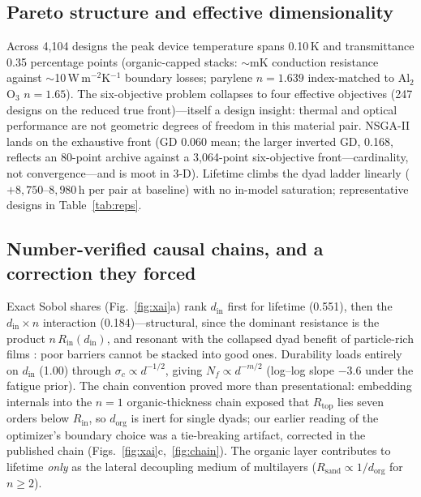 \documentclass[11pt]{article}
\newcommand{\dorg}{d_{\mathrm{org}}}
\newcommand{\din}{d_{\mathrm{in}}}
\begin{document}
\subsection{Pareto structure and effective dimensionality}
Across 4{,}104 designs the peak device temperature spans 0.10\,K and transmittance 0.35 percentage points (organic-capped stacks: $\sim$mK conduction resistance against $\sim$10\,W\,m$^{-2}$K$^{-1}$ boundary losses; parylene $n{=}1.639$ index-matched to Al$_2$O$_3$ $n{=}1.65$). The six-objective problem collapses to four effective objectives (247 designs on the reduced true front)---itself a design insight: thermal and optical performance are not geometric degrees of freedom in this material pair. NSGA-II lands on the exhaustive front (GD 0.060 mean; the larger inverted GD, 0.168, reflects an 80-point archive against a 3{,}064-point six-objective front---cardinality, not convergence---and is moot in 3-D). Lifetime climbs the dyad ladder linearly ($+8{,}750$--$8{,}980$\,h per pair at baseline) with no in-model saturation; representative designs in Table~\ref{tab:reps}.

\subsection{Number-verified causal chains, and a correction they forced}
Exact Sobol shares (Fig.~\ref{fig:xai}a) rank $\din$ first for lifetime (0.551), then the $\din\times n$ interaction (0.184)---structural, since the dominant resistance is the product $n\,R_{\mathrm{in}}(\din)$, and resonant with the collapsed dyad benefit of particle-rich films \cite{wu2018}: poor barriers cannot be stacked into good ones. Durability loads entirely on $\din$ (1.00) through $\sigma_c\propto d^{-1/2}$, giving $N_f\propto d^{-m/2}$ (log--log slope $-3.6$ under the fatigue prior). The chain convention proved more than presentational: embedding internals into the $n{=}1$ organic-thickness chain exposed that $R_{\mathrm{top}}$ lies seven orders below $R_{\mathrm{in}}$, so $\dorg$ is inert for single dyads; our earlier reading of the optimizer's boundary choice was a tie-breaking artifact, corrected in the published chain (Figs.~\ref{fig:xai}c,~\ref{fig:chain}). The organic layer contributes to lifetime \emph{only} as the lateral decoupling medium of multilayers ($R_{\mathrm{sand}}\propto1/\dorg$ for $n\ge2$).
\end{document}
